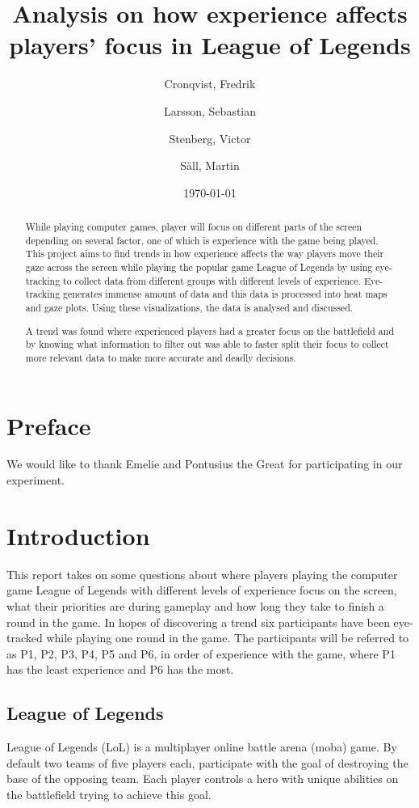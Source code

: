 \documentclass[notitlepage]{report}
\author{Cronqvist, Fredrik \and Larsson, Sebastian \and Stenberg, Victor \and S\"{a}ll, Martin}
\date{\today}
\title{Analysis on how experience affects players' focus in League of Legends}
\begin{document}
\maketitle

\begin{abstract}
While playing computer games, player will focus on different parts of the screen depending on several factor, one of which is experience with the game being played. This project aims to find trends in how experience affects the way players move their gaze across the screen while playing the popular game League of Legends by using eye-tracking to collect data from different groups with different levels of experience. Eye-tracking generates immense amount of data and this data is processed into heat maps and gaze plots. Using these visualizations, the data is analysed and discussed.

A trend was found where experienced players had a greater focus on the battlefield and by knowing what information to filter out was able to faster split their focus to collect more relevant data to make more accurate and deadly decisions.
\end{abstract}

\begingroup
\chapter*{Preface}
We would like to thank Emelie and Pontusius the Great for participating in our experiment.

\let\clearpage\relax

\tableofcontents
\endgroup

\chapter{Introduction}
This report takes on some questions about where players playing the computer game League of Legends with different levels of experience focus on the screen, what their priorities are during gameplay and how long they take to finish a round in the game. In hopes of discovering a trend six participants have been eye-tracked while playing one round in the game. The participants will be referred to as P1, P2, P3, P4, P5 and P6, in order of experience with the game, where P1 has the least experience and P6 has the most.

\section{League of Legends}
League of Legends (LoL) is a multiplayer online battle arena (moba) game. By default two teams of five players each, participate with the goal of destroying the base of the opposing team. Each player controls a hero with unique abilities on the battlefield trying to achieve this goal.
\end{document}
